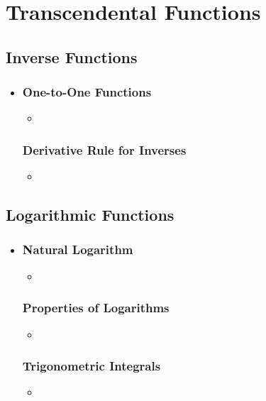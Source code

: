 \chapter{Transcendental Functions}

\section{Inverse Functions}
\begin{itemize}
  \item []

  \subsection{One-to-One Functions}
  \begin{itemize}
    \item
  \end{itemize}

  \subsection{Derivative Rule for Inverses}
  \begin{itemize}
    \item
  \end{itemize}

\end{itemize}

\section{Logarithmic Functions}
\begin{itemize}
  \item []

  \subsection{Natural Logarithm}
  \begin{itemize}
    \item
  \end{itemize}

  \subsection{Properties of Logarithms}
  \begin{itemize}
    \item
  \end{itemize}

  \subsection{Trigonometric Integrals}
  \begin{itemize}
    \item
  \end{itemize}

\end{itemize}


